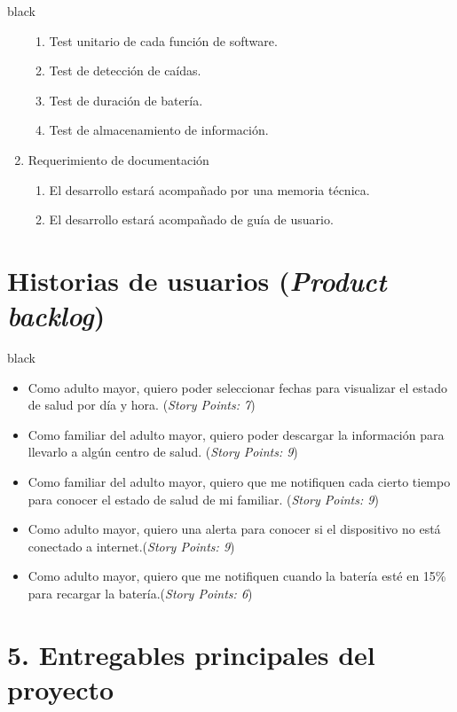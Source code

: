 \documentclass[11pt]{charter}
\begin{document}
\begin{consigna}{black}
\begin{enumerate}
	\begin{enumerate}
	\item Test unitario de cada función de software.
	\item Test de detección de caídas.
	\item Test de duración de batería.
	\item Test de almacenamiento de información.
	\end{enumerate}
\item Requerimiento de documentación
	\begin{enumerate}
	\item El desarrollo estará acompañado por una memoria técnica.
	\item El desarrollo estará acompañado de guía de usuario.
	\end{enumerate}

\end{enumerate}
\end{consigna}

\section{Historias de usuarios (\textit{Product backlog})}
\label{sec:backlog}

\begin{consigna}{black}
\vspace{-35px}
\begin{itemize}
\item Como adulto mayor, quiero poder seleccionar fechas para visualizar el estado de salud por día y hora. (\textit{Story Points: 7})
\item Como familiar del adulto mayor, quiero poder descargar la información para llevarlo a algún centro de salud. (\textit{Story Points: 9}) 
\item Como familiar del adulto mayor, quiero que me notifiquen cada cierto tiempo para conocer el estado de salud de mi familiar. (\textit{Story Points: 9}) 
\item Como adulto mayor, quiero una alerta para conocer si el dispositivo no está conectado a internet.(\textit{Story Points: 9})  
\item Como adulto mayor, quiero que me notifiquen cuando la batería esté en 15\% para recargar la batería.(\textit{Story Points: 6}) 
\end{itemize}
\end{consigna}

\section{5. Entregables principales del proyecto}
\label{sec:entregables}
\end{document}
